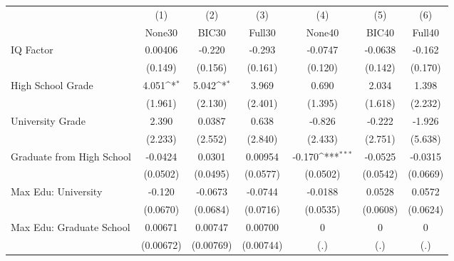 {
\def\sym#1{\ifmmode^{#1}\else\(^{#1}\)\fi}
\begin{tabular}{l*{6}{c}}
\toprule
            &\multicolumn{1}{c}{(1)}&\multicolumn{1}{c}{(2)}&\multicolumn{1}{c}{(3)}&\multicolumn{1}{c}{(4)}&\multicolumn{1}{c}{(5)}&\multicolumn{1}{c}{(6)}\\
            &\multicolumn{1}{c}{None30}&\multicolumn{1}{c}{BIC30}&\multicolumn{1}{c}{Full30}&\multicolumn{1}{c}{None40}&\multicolumn{1}{c}{BIC40}&\multicolumn{1}{c}{Full40}\\
\midrule
IQ Factor   &     0.00406         &      -0.220         &      -0.293         &     -0.0747         &     -0.0638         &      -0.162         \\
            &     (0.149)         &     (0.156)         &     (0.161)         &     (0.120)         &     (0.142)         &     (0.170)         \\
\addlinespace
High School Grade&       4.051\sym{*}  &       5.042\sym{*}  &       3.969         &       0.690         &       2.034         &       1.398         \\
            &     (1.961)         &     (2.130)         &     (2.401)         &     (1.395)         &     (1.618)         &     (2.232)         \\
\addlinespace
University Grade&       2.390         &      0.0387         &       0.638         &      -0.826         &      -0.222         &      -1.926         \\
            &     (2.233)         &     (2.552)         &     (2.840)         &     (2.433)         &     (2.751)         &     (5.638)         \\
\addlinespace
Graduate from High School&     -0.0424         &      0.0301         &     0.00954         &      -0.170\sym{***}&     -0.0525         &     -0.0315         \\
            &    (0.0502)         &    (0.0495)         &    (0.0577)         &    (0.0502)         &    (0.0542)         &    (0.0669)         \\
\addlinespace
Max Edu: University&      -0.120         &     -0.0673         &     -0.0744         &     -0.0188         &      0.0528         &      0.0572         \\
            &    (0.0670)         &    (0.0684)         &    (0.0716)         &    (0.0535)         &    (0.0608)         &    (0.0624)         \\
\addlinespace
Max Edu: Graduate School&     0.00671         &     0.00747         &     0.00700         &           0         &           0         &           0         \\
            &   (0.00672)         &   (0.00769)         &   (0.00744)         &         (.)         &         (.)         &         (.)         \\
\bottomrule
\end{tabular}
}
